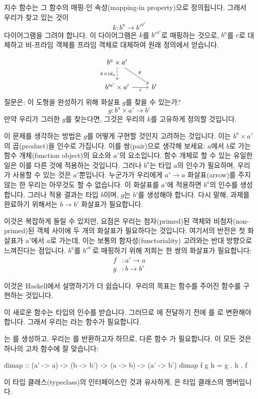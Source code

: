 \documentclass[DaoFP]{subfiles}
\begin{document}
지수 함수는 그 함수의 매핑-인 속성(mapping-in property)으로 정의됩니다. 그래서 우리가 찾고 있는 것이
\[k \colon b^a \to b'^{a'} \]
다이어그램을 그려야 합니다. 이 다이어그램은 $k$를 $b'^{a'}$로 매핑하는 것으로, $b^a$를 $c$로 대체하고 비-프라임 객체를 프라임 객체로 대체하여 원래 정의에서 얻습니다.

\[
 \begin{tikzcd}
 b^a \times a'
 \arrow[d, dashed, "k \times id_a"']
 \arrow[rd, "g"]
 \\
 b'^{a'} \times a'
 \arrow[r, "\varepsilon"']
& b'
 \end{tikzcd}
\]
질문은: 이 도형을 완성하기 위해 화살표 $g$를 찾을 수 있는가?
\[g \colon b^a \times a' \to b'\]
만약 우리가 그러한 $g$를 찾는다면, 그것은 우리의 $k$를 고유하게 정의할 것입니다.

이 문제를 생각하는 방법은 $g$를 어떻게 구현할 것인지 고려하는 것입니다. 이는 $b^a \times a'$의 곱(product)을 인수로 가집니다. 이를 쌍(pair)으로 생각해 보세요: $a$에서 $b$로 가는 함수 개체(function object)의 요소와 $a'$의 요소입니다. 함수 개체로 할 수 있는 유일한 일은 이를 다른 것에 적용하는 것입니다. 그러나 $b^a$는 타입 $a$의 인수가 필요하며, 우리가 사용할 수 있는 것은 $a'$뿐입니다. 누군가가 우리에게 $a' \to a$ 화살표(arrow)를 주지 않는 한 우리는 아무것도 할 수 없습니다. 이 화살표를 $a'$에 적용하면 $b^a$의 인수를 생성합니다. 그러나 적용 결과는 타입 $b$이며, $g$는 $b'$를 생성해야 합니다. 다시 말해, 과제를 완료하기 위해서는 $b \to b'$ 화살표가 필요합니다.

이것은 복잡하게 들릴 수 있지만, 요점은 우리는 첨자(primed)된 객체와 비첨자(non-primed)된 객체 사이에 두 개의 화살표가 필요하다는 것입니다. 여기서의 반전은 첫 화살표가 $a'$에서 $a$로 가는데, 이는 보통의 함자성(functoriality) 고려와는 반대 방향으로 느껴진다는 점입니다. $b^a$를 $b'^{a'}$로 매핑하기 위해 저희는 한 쌍의 화살표가 필요합니다:
\begin{align*}
f &\colon a' \to a \\
g &\colon b \to b' 
\end{align*}

이것은 Haskell에서 설명하기가 더 쉽습니다. 우리의 목표는  함수를 주어진  함수를 구현하는 것입니다.

이 새로운 함수는  타입의 인수를 받습니다. 그러므로 에 전달하기 전에 를 로 변환해야 합니다. 그래서 우리는 라는 함수가 필요합니다.

는 를 생성하고, 우리는 를 반환하고자 하므로, 다른 함수 가 필요합니다. 이 모든 것은 하나의 고차 함수에 잘 맞습니다:
\begin{haskell}
dimap :: (a' -> a) -> (b -> b') -> (a -> b) -> (a' -> b')
dimap f g h = g . h . f
\end{haskell}
이  타입 클래스(typeclass)의 인터페이스인 것과 유사하게, 은  타입 클래스의 멤버입니다.
\end{document}
